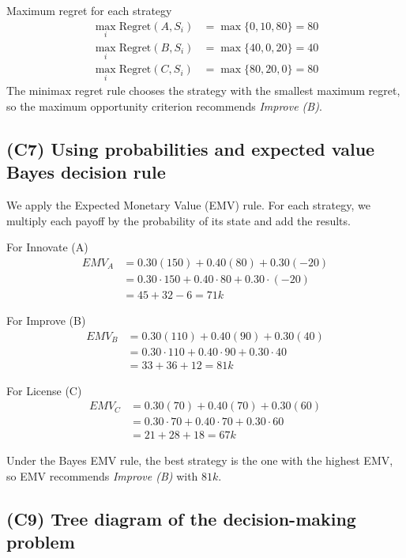 	Maximum regret for each strategy
	\[
	\begin{aligned}
		\max_i \text{Regret}(A, S_i) &= \max\{0, 10, 80\} = 80\\
		\max_i \text{Regret}(B, S_i) &= \max\{40, 0, 20\} = 40\\
		\max_i \text{Regret}(C, S_i) &= \max\{80, 20, 0\} = 80
	\end{aligned}
	\]
	The minimax regret rule chooses the strategy with the smallest maximum regret, so the
	maximum opportunity criterion recommends \emph{Improve (B)}.
	
	\subsection{(C7) Using probabilities and expected value Bayes decision rule}\label{example-1-c7}
	
	We apply the Expected Monetary Value (EMV) rule. For each strategy, we multiply each payoff by the probability
	of its state and add the results.
	
	For Innovate (A)
	\[
	\begin{aligned}
		EMV_A &= 0.30(150) + 0.40(80) + 0.30(-20) \\
		&= 0.30\cdot150 + 0.40\cdot80 + 0.30\cdot(-20) \\
		&= 45 + 32 - 6 = 71k
	\end{aligned}
	\]
	
	For Improve (B)
	\[
	\begin{aligned}
		EMV_B &= 0.30(110) + 0.40(90) + 0.30(40) \\
		&= 0.30\cdot110 + 0.40\cdot90 + 0.30\cdot40 \\
		&= 33 + 36 + 12 = 81k
	\end{aligned}
	\]
	
	For License (C)
	\[
	\begin{aligned}
		EMV_C &= 0.30(70) + 0.40(70) + 0.30(60) \\
		&= 0.30\cdot70 + 0.40\cdot70 + 0.30\cdot60 \\
		&= 21 + 28 + 18 = 67k
	\end{aligned}
	\]
	
	Under the Bayes EMV rule, the best strategy is the one with the highest EMV, so EMV recommends
	\emph{Improve (B)} with \(81k\).
	
	\subsection{(C9) Tree diagram of the decision-making problem}\label{example-1-c9}
	
